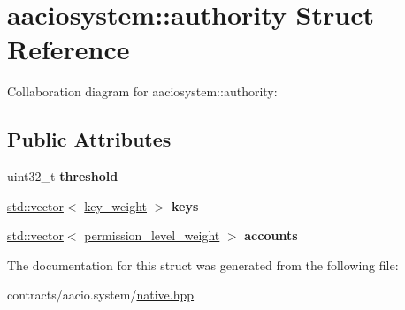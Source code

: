 \hypertarget{structaaciosystem_1_1authority}{}\section{aaciosystem\+:\+:authority Struct Reference}
\label{structaaciosystem_1_1authority}


Collaboration diagram for aaciosystem\+:\+:authority\+:
\subsection*{Public Attributes}
\begin{DoxyCompactItemize}
\item 
\mbox{\label{structaaciosystem_1_1authority_a1cadad91fcce07ef6b1a5f8fd58f8498}} 
uint32\+\_\+t {\bfseries threshold}
\item 
\mbox{\label{structaaciosystem_1_1authority_a01f5aaf6674f67b53c2c998d4c7ae906}} 
\mbox{\hyperlink{classstd_1_1vector}{std\+::vector}}$<$ \mbox{\hyperlink{structaaciosystem_1_1key__weight}{key\+\_\+weight}} $>$ {\bfseries keys}
\item 
\mbox{\label{structaaciosystem_1_1authority_a0066f633f2fc4227af497d306700b8ed}} 
\mbox{\hyperlink{classstd_1_1vector}{std\+::vector}}$<$ \mbox{\hyperlink{structaaciosystem_1_1permission__level__weight}{permission\+\_\+level\+\_\+weight}} $>$ {\bfseries accounts}
\end{DoxyCompactItemize}


The documentation for this struct was generated from the following file\+:\begin{DoxyCompactItemize}
\item 
contracts/aacio.\+system/\mbox{\hyperlink{native_8hpp}{native.\+hpp}}\end{DoxyCompactItemize}
